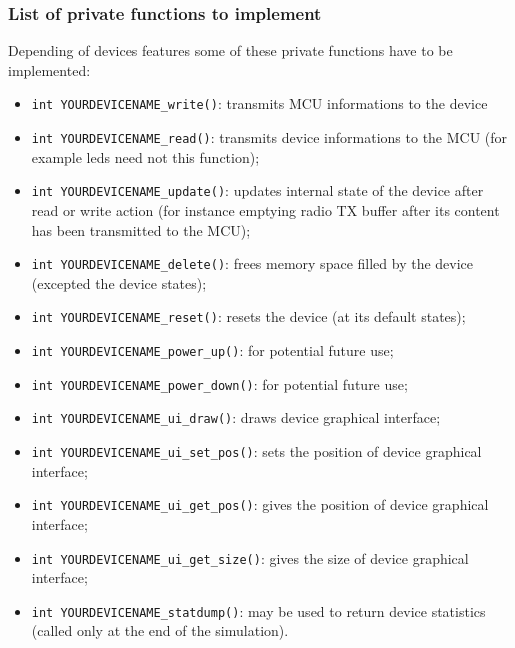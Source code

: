 \documentclass[a4paper,10pt]{report}
\begin{document}
\subsubsection{List of private functions to implement}
Depending of devices features some of these private functions have to be implemented:
\begin{itemize}
  \item \verb$int YOURDEVICENAME_write()$: transmits MCU informations to the device
  \item \verb$int YOURDEVICENAME_read()$: transmits device informations to the MCU (for example leds need not this function);
  \item \verb$int YOURDEVICENAME_update()$: updates internal state of the device after read or write action (for instance emptying radio TX buffer after its content has been transmitted to the MCU);
  \item \verb$int YOURDEVICENAME_delete()$: frees memory space filled by the device (excepted the device states);
  \item \verb$int YOURDEVICENAME_reset()$: resets the device (at its default states);
  \item \verb$int YOURDEVICENAME_power_up()$: for potential future use;
  \item \verb$int YOURDEVICENAME_power_down()$: for potential future use;
  \item \verb$int YOURDEVICENAME_ui_draw()$: draws device graphical interface;
  \item \verb$int YOURDEVICENAME_ui_set_pos()$: sets the position of device graphical interface;
  \item \verb$int YOURDEVICENAME_ui_get_pos()$: gives the position of device graphical interface;
  \item \verb$int YOURDEVICENAME_ui_get_size()$: gives the size of device graphical interface;
  \item \verb$int YOURDEVICENAME_statdump()$: may be used to return device statistics (called only at the end of the simulation).
\end{itemize}
\end{document}
